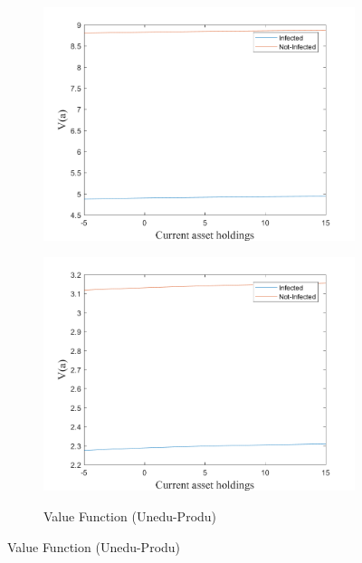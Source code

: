 \begin{figure}[H]
\begin{subfigure}{0.5\textwidth}
   \includegraphics[width=\linewidth,height = 0.22\textheight]{figures/matu/FIG15.png}
    \label{fig_dert}
\end{subfigure}
\hspace*{\fill}
\begin{subfigure}{0.5\textwidth}\caption{Value Function (Unedu-Produ)}
   \includegraphics[width=\linewidth,height = 0.22\textheight]{figures/matu/FIG16.png}
    \label{fig:x_b}
\end{subfigure}
\hspace*{\fill}
\label{lafigura5}
\end{figure}
\newpage
